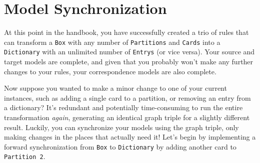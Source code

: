 \newpage
\section{Model Synchronization}
\genHeader

At this point in the handbook, you have successfully created a trio of rules that can transform a \texttt{Box} with any number of \texttt{Partitions} and
\texttt{Cards} into a \texttt{Dictionary} with an unlimited number of \texttt{Entrys} (or vice versa). Your source and target models are complete, and given
that you probably won't make any further changes to your rules, your correspondence models are also complete.

Now suppose you wanted to make a minor change to one of your current instances, such as adding a single card to a partition, or removing an entry from a
dictionary? It's redundant and potentially time-consuming to run the entire transformation \emph{again}, generating an identical graph triple for a slightly
different result. Luckily, you can synchronize your models using the graph triple, only making changes in the places that actually need it! Let's begin by
implementing a forward synchronization from \texttt{Box} to \texttt{Dictionary} by adding another card to \texttt{Partition 2}.

